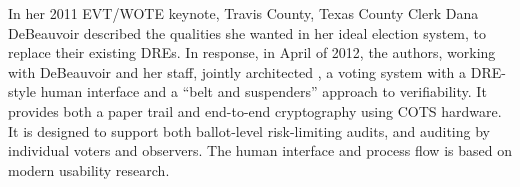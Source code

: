 In her 2011 EVT/WOTE keynote, Travis County, Texas County Clerk
Dana DeBeauvoir described the qualities she wanted in her ideal election system,
to replace their existing DREs.
In response, in April of 2012, the authors, working with DeBeauvoir and her staff,
jointly architected \projname, a voting system with a DRE-style human interface
and a ``belt and suspenders'' approach to verifiability.
It provides both a paper trail and end-to-end cryptography using COTS hardware.
It is designed to support both ballot-level risk-limiting audits,
and auditing by individual voters and observers.
The human interface and process flow is based on modern usability research.
